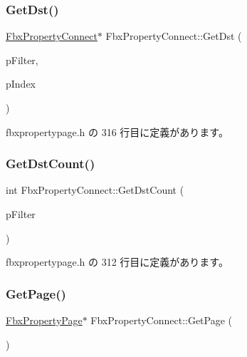 \subsubsection{\texorpdfstring{Get\+Dst()}{GetDst()}}
{\footnotesize\ttfamily \hyperlink{class_fbx_property_connect}{Fbx\+Property\+Connect}$\ast$ Fbx\+Property\+Connect\+::\+Get\+Dst (\begin{DoxyParamCaption}\item[{\hyperlink{class_fbx_connection_point_filter}{Fbx\+Connection\+Point\+Filter} $\ast$}]{p\+Filter,  }\item[{int}]{p\+Index }\end{DoxyParamCaption})\hspace{0.3cm}{\ttfamily [inline]}}



 fbxpropertypage.\+h の 316 行目に定義があります。

\mbox{\label{class_fbx_property_connect_ab113f35b3c1ec46e432d2214585d28aa}} 
\subsubsection{\texorpdfstring{Get\+Dst\+Count()}{GetDstCount()}}
{\footnotesize\ttfamily int Fbx\+Property\+Connect\+::\+Get\+Dst\+Count (\begin{DoxyParamCaption}\item[{\hyperlink{class_fbx_connection_point_filter}{Fbx\+Connection\+Point\+Filter} $\ast$}]{p\+Filter }\end{DoxyParamCaption})\hspace{0.3cm}{\ttfamily [inline]}}



 fbxpropertypage.\+h の 312 行目に定義があります。

\mbox{\label{class_fbx_property_connect_a738445f2445642878f28886d95e107e9}} 
\subsubsection{\texorpdfstring{Get\+Page()}{GetPage()}}
{\footnotesize\ttfamily \hyperlink{class_fbx_property_page}{Fbx\+Property\+Page}$\ast$ Fbx\+Property\+Connect\+::\+Get\+Page (\begin{DoxyParamCaption}{ }\end{DoxyParamCaption})\hspace{0.3cm}{\ttfamily [inline]}}



